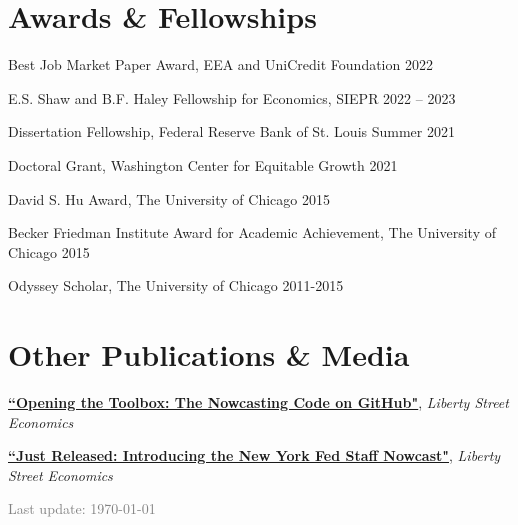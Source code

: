 \documentclass[margin,line]{res}                          %
\newenvironment{list1}{
	\begin{list}{\ding{113}}{%
			\setlength{\itemsep}{0in}
			\setlength{\parsep}{0in} \setlength{\parskip}{0in}
			\setlength{\topsep}{0in} \setlength{\partopsep}{0in}
			\setlength{\leftmargin}{0.17in}}}{\end{list}}
\begin{document}
\begin{resume}
	
	\section{\sc Awards \& Fellowships}
	\begin{list1}
		\item[] Best Job Market Paper Award, EEA and UniCredit Foundation
		\hfill 2022\smallskip
		\item[] E.S. Shaw and B.F. Haley Fellowship for Economics, SIEPR \hfill 2022 -- 2023\smallskip
		\item[] Dissertation Fellowship, Federal Reserve Bank of St. Louis  \hfill Summer 2021\smallskip
		\item[] Doctoral Grant, Washington Center for Equitable Growth \hfill 2021\smallskip
		\item[] David S. Hu Award, The University of Chicago \hfill 2015\smallskip
		\item[] Becker Friedman Institute Award for Academic Achievement, The University of Chicago \hfill 2015\smallskip
		\item[] Odyssey Scholar, The University of Chicago \hfill 2011-2015\smallskip
	\end{list1}
	
	\section{\sc Other Publications \& Media} 
	\begin{list1}
		\item[] \href{https://libertystreeteconomics.newyorkfed.org/2018/08/opening-the-toolbox-the-nowcasting-code-on-github/}{\textbf{``Opening the Toolbox: The Nowcasting Code on GitHub"}}, \textit{{Liberty Street Economics}}  \smallskip
		\item[] \href{https://libertystreeteconomics.newyorkfed.org/2016/04/just-released-introducing-the-frbny-nowcast/}{\textbf{``Just Released: Introducing the New York Fed Staff Nowcast"}}, \textit{{Liberty Street Economics}} \smallskip            
	\end{list1}
	\vfill
	\hfill \textcolor{gray}{Last update: \today} 
	
	
	
	
	
\end{resume}
\end{document}

